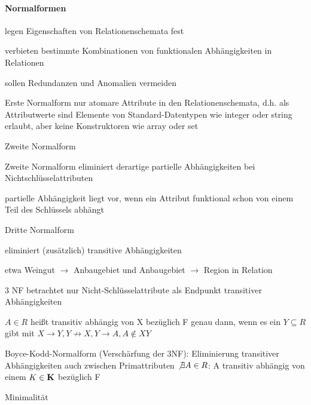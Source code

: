 \documentclass[a4paper]{article}
\begin{document}
\begin{multicols}{3}
    \paragraph{Normalformen}
    \begin{itemize*}
        \item legen Eigenschaften von Relationenschemata fest
        \item verbieten bestimmte Kombinationen von funktionalen Abhängigkeiten in Relationen
        \item sollen Redundanzen und Anomalien vermeiden
    \end{itemize*}
    \begin{description*}
        \item[Erste Normalform] nur atomare Attribute in den Relationenschemata, d.h. als Attributwerte sind Elemente von Standard-Datentypen wie integer oder string erlaubt, aber keine Konstruktoren wie array oder set
        \item[Zweite Normalform]
        \begin{itemize*}
            \item Zweite Normalform eliminiert derartige partielle Abhängigkeiten bei Nichtschlüsselattributen
            \item partielle Abhängigkeit liegt vor, wenn ein Attribut funktional schon von einem Teil des Schlüssels abhängt
        \end{itemize*}
        \item[Dritte Normalform]
        \begin{itemize*}
            \item eliminiert (zusätzlich) transitive Abhängigkeiten
            \item etwa Weingut $\rightarrow$ Anbaugebiet und Anbaugebiet $\rightarrow$ Region in Relation
            \item 3 NF betrachtet nur Nicht-Schlüsselattribute als Endpunkt transitiver Abhängigkeiten
            \item $A \in R$ heißt transitiv abhängig von X bezüglich F genau dann, wenn es ein $Y\subseteq R$ gibt mit $X \rightarrow Y, Y \not\rightarrow X, Y \rightarrow A, A \not\in XY$
        \end{itemize*}
        \item[Boyce-Kodd-Normalform] (Verschärfung der 3NF): Eliminierung transitiver Abhängigkeiten auch zwischen Primattributen $\not\exists A \in R$: A transitiv abhängig von einem $K\in\bf{K}$ bezüglich F
        \item[Minimalität]

\end{description*}
\end{multicols}
\end{document}
